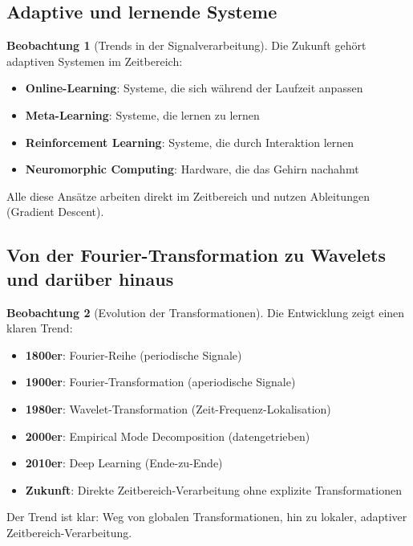 ﻿\documentclass[a4paper,12pt]{report}
\theoremstyle{definition}
\newtheorem{beobachtung}{Beobachtung}
\begin{document}
	\subsection{Adaptive und lernende Systeme}
	
	\begin{beobachtung}[Trends in der Signalverarbeitung]
		Die Zukunft gehört adaptiven Systemen im Zeitbereich:
		
		\begin{itemize}
			\item[-] \textbf{Online-Learning}: Systeme, die sich während der Laufzeit anpassen
			\item[-] \textbf{Meta-Learning}: Systeme, die lernen zu lernen
			\item[-] \textbf{Reinforcement Learning}: Systeme, die durch Interaktion lernen
			\item[-] \textbf{Neuromorphic Computing}: Hardware, die das Gehirn nachahmt
		\end{itemize}
		
		Alle diese Ansätze arbeiten direkt im Zeitbereich und nutzen Ableitungen (Gradient Descent).
	\end{beobachtung}
	
	\subsection{Von der Fourier-Transformation zu Wavelets und darüber hinaus}
	
	\begin{beobachtung}[Evolution der Transformationen]
		Die Entwicklung zeigt einen klaren Trend:
		
		\begin{itemize}
			\item[-] \textbf{1800er}: Fourier-Reihe (periodische Signale)
			\item[-] \textbf{1900er}: Fourier-Transformation (aperiodische Signale)
			\item[-] \textbf{1980er}: Wavelet-Transformation (Zeit-Frequenz-Lokalisation)
			\item[-] \textbf{2000er}: Empirical Mode Decomposition (datengetrieben)
			\item[-] \textbf{2010er}: Deep Learning (Ende-zu-Ende)
			\item[-] \textbf{Zukunft}: Direkte Zeitbereich-Verarbeitung ohne explizite Transformationen
		\end{itemize}
		
		Der Trend ist klar: Weg von globalen Transformationen, hin zu lokaler, adaptiver Zeitbereich-Verarbeitung.
	\end{beobachtung}
	
\end{document}
